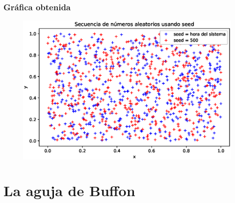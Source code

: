 \begin{frame}[fragile]
\frametitle{Gráfica obtenida}
\begin{figure}
 \centering
 \includegraphics[scale=0.5]{Imagenes/Secuencia_aleatoria_05.eps}
\end{figure}
\end{frame}
\section{La aguja de Buffon}
